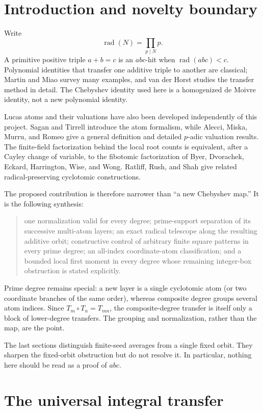 \documentclass[11pt]{article}
\theoremstyle{definition}
\theoremstyle{remark}
\newcommand{\rad}{\operatorname{rad}}
\begin{document}
\section{Introduction and novelty boundary}

Write
\[
 \rad(N)=\prod_{p\mid N}p.
\]
A primitive positive triple $a+b=c$ is an $abc$-hit when
\(\rad(abc)<c\).  Polynomial identities that transfer one additive triple
to another are classical; Martin and Miao survey many examples, and van der
Horst studies the transfer method in detail.  The Chebyshev identity used
here is a homogenized de Moivre identity, not a new polynomial identity.

Lucas atoms and their valuations have also been developed independently of
this project.  Sagan and Tirrell introduce the atom formalism, while Alecci,
Miska, Murru, and Romeo give a general definition and detailed $p$-adic
valuation results.  The finite-field factorization behind the local root
counts is equivalent, after a Cayley change of variable, to the fibotomic
factorization of Byer, Dvorachek, Eckard, Harrington, Wise, and Wong.
Ratliff, Rush, and Shah give related radical-preserving cyclotomic
constructions.

The proposed contribution is therefore narrower than ``a new Chebyshev
map.''  It is the following synthesis:

\begin{quote}\small
one normalization valid for every degree; prime-support separation of its
successive multi-atom layers; an exact radical telescope along the
resulting additive orbit; constructive control of arbitrary finite square
patterns in every prime degree; an all-index coordinate-atom
classification; and a bounded local first moment in every degree whose
remaining integer-box obstruction is stated explicitly.
\end{quote}

Prime degree remains special: a new layer is a single cyclotomic atom (or
two coordinate branches of the same order), whereas composite degree
groups several atom indices.  Since $T_m\circ T_n=T_{mn}$, the
composite-degree transfer is itself only a block of lower-degree transfers.
The grouping and normalization, rather than the map, are the point.

The last sections distinguish finite-seed averages from a single fixed
orbit.  They sharpen the fixed-orbit obstruction but do not resolve it.
In particular, nothing here should be read as a proof of $abc$.

\section{The universal integral transfer}
\end{document}
